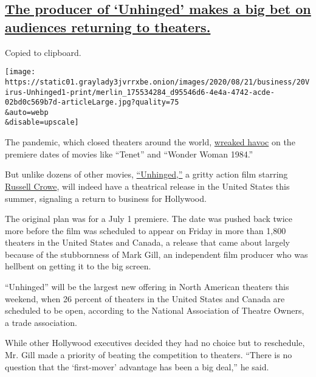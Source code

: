 \hypertarget{the-producer-of-unhinged-makes-a-big-bet-on-audiences-returning-to-theaters}{%
\subsection{\texorpdfstring{\protect\hyperlink{the-producer-of-unhinged-makes-a-big-bet-on-audiences-returning-to-theaters.html}{The
producer of `Unhinged' makes a big bet on audiences returning to
theaters.}}{The producer of `Unhinged' makes a big bet on audiences returning to theaters.}}\label{the-producer-of-unhinged-makes-a-big-bet-on-audiences-returning-to-theaters}}

Copied to clipboard.

\texttt{[image: https://static01.graylady3jvrrxbe.onion/images/2020/08/21/business/20Virus-Unhinged1-print/merlin\_175534284\_d95546d6-4e4a-4742-acde-02bd0c569b7d-articleLarge.jpg?quality=75\\\&auto=webp\\\&disable=upscale]}

The pandemic, which closed theaters around the world,
\href{https://www.nytimes3xbfgragh.onion/2020/06/12/business/media/tenet-release-delayed.html}{wreaked
havoc} on the premiere dates of movies like ``Tenet'' and ``Wonder Woman
1984.''

But unlike dozens of other movies,
\href{https://www.nytimes3xbfgragh.onion/2020/08/20/movies/unhinged-review.html}{``Unhinged,''}
a gritty action film starring
\href{https://www.nytimes3xbfgragh.onion/2019/06/27/arts/television/loudest-voice-roger-ailes-russell-crowe.html}{Russell
Crowe}, will indeed have a theatrical release in the United States this
summer, signaling a return to business for Hollywood.

The original plan was for a July 1 premiere. The date was pushed back
twice more before the film was scheduled to appear on Friday in more
than 1,800 theaters in the United States and Canada, a release that came
about largely because of the stubbornness of Mark Gill, an independent
film producer who was hellbent on getting it to the big screen.

``Unhinged'' will be the largest new offering in North American theaters
this weekend, when 26 percent of theaters in the United States and
Canada are scheduled to be open, according to the National Association
of Theatre Owners, a trade association.

While other Hollywood executives decided they had no choice but to
reschedule, Mr. Gill made a priority of beating the competition to
theaters. ``There is no question that the `first-mover' advantage has
been a big deal,'' he said.

